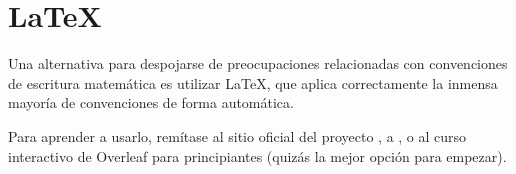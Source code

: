\section{\LaTeX{}}

Una alternativa para despojarse de preocupaciones relacionadas con convenciones de escritura matemática es utilizar \LaTeX{}, que aplica correctamente la inmensa mayoría de convenciones de forma automática.

Para aprender a usarlo, remítase al sitio oficial del proyecto \cite{latexproject}, a \cite{oetiker2021lshort}, o al curso interactivo de Overleaf para principiantes \cite{overleaf2024novice} (quizás la mejor opción para empezar).
